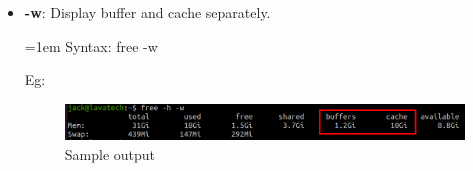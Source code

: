 \begin{flushleft}
\begin{itemize}
\begin{itemize}
	\newpage
	\item \textbf{-w}: Display buffer and cache separately.
	\bigskip
	\begin{tcolorbox}[breakable,notitle,boxrule=-0pt,colback=pink,colframe=pink]
		\color{black}
		\font=1em
		Syntax: free -w
		\font=4pt
	\end{tcolorbox}
	Eg:
	\begin{figure}[h!]
		\centering
		\includegraphics[scale=.25]{content/chapter12/images/free_3.png}
		\caption{Sample output}
		\label{fig:free_3}
	\end{figure}

\bigskip
\bigskip
	
	\end{itemize}
	

\end{itemize}
\end{flushleft}
